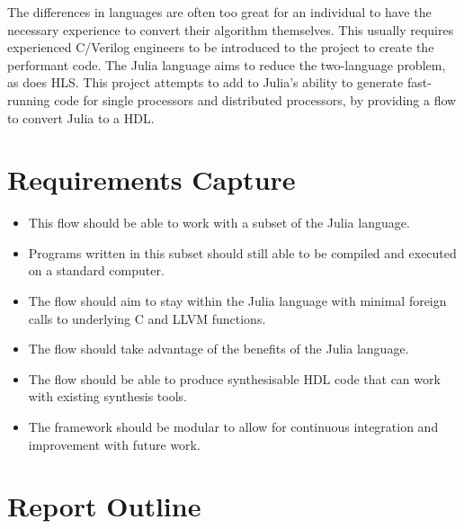 The differences in languages are often too great for an individual to have the necessary experience to convert their algorithm themselves. This usually requires experienced  C/Verilog engineers to be introduced to the project to create the performant code. The Julia language aims to reduce the two-language problem, as does HLS. This project attempts to add to Julia's ability to generate fast-running code for single processors and distributed processors, by providing a flow to convert Julia to a HDL.

\section{Requirements Capture}
\begin{itemize}
    \item This flow should be able to work with a subset of the Julia language. 
    \item Programs written in this subset should still able to be compiled and executed on a standard computer.
    \item The flow should aim to stay within the Julia language with minimal foreign calls to underlying C and LLVM functions.
    \item The flow should take advantage of the benefits of the Julia language.
    
    \item The flow should be able to produce synthesisable HDL code that can work with existing synthesis tools. 
    
    \item The framework should be modular to allow for continuous integration and improvement with future work.
\end{itemize}


\section{Report Outline} %
